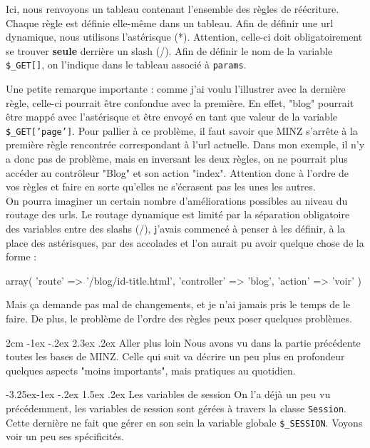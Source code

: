 \documentclass[a4paper,11pt]{article}
\makeatletter
\renewcommand\section{\@startsection{section}{1}{\z@}%
	{2cm \@plus -1ex \@minus -.2ex}%
	{2.3ex \@plus.2ex}%
	{\color{bleuClair}\reset@font\Large\bfseries}}
\renewcommand{\subsection}{\@startsection{subsection}{2}{\z@}%
             {-3.25ex\@plus -1ex \@minus -.2ex}%
             {1.5ex \@plus .2ex}%
             {\color{bleuFonce}\normalfont\large\bfseries}}
\makeatother
\begin{document}
Ici, nous renvoyons un tableau contenant l'ensemble des règles de réécriture. Chaque règle est définie elle-même dans un tableau. Afin de définir une url dynamique, nous utilisons l'astérisque (*). Attention, celle-ci doit obligatoirement se trouver \textbf{seule} derrière un slash (/). Afin de définir le nom de la variable \texttt{\$\_GET[]}, on l'indique dans le tableau associé à \texttt{params}.

Une petite remarque importante : comme j'ai voulu l'illustrer avec la dernière règle, celle-ci pourrait être confondue avec la première. En effet, "blog" pourrait être mappé avec l'astérisque et être envoyé en tant que valeur de la variable \texttt{\$\_GET['page']}. Pour pallier à ce problème, il faut savoir que MINZ s'arrête à la première règle rencontrée correspondant à l'url actuelle. Dans mon exemple, il n'y a donc pas de problème, mais en inversant les deux règles, on ne pourrait plus accéder au contrôleur "Blog" et son action "index". Attention donc à l'ordre de vos règles et faire en sorte qu'elles ne s'écrasent pas les unes les autres.\\

On pourra imaginer un certain nombre d'améliorations possibles au niveau du routage des urls. Le routage dynamique est limité par la séparation obligatoire des variables entre des slashs (/), j'avais commencé à penser à les définir, à la place des astérisques, par des accolades et l'on aurait pu avoir quelque chose de la forme :
\begin{PHP}
array(
  'route'       => '/blog/{id}-{title}.html',
  'controller'  => 'blog',
  'action'      => 'voir'
)
\end{PHP}
Mais ça demande pas mal de changements, et je n'ai jamais pris le temps de le faire. De plus, le problème de l'ordre des règles peux poser quelques problèmes.

\newpage

\section{Aller plus loin}
Nous avons vu dans la partie précédente toutes les bases de MINZ. Celle qui suit va décrire un peu plus en profondeur quelques aspects "moins importants", mais pratiques au quotidien.

\subsection{Les variables de session}
On l'a déjà un peu vu précédemment, les variables de session sont gérées à travers la classe \texttt{Session}. Cette dernière ne fait que gérer en son sein la variable globale \texttt{\$\_SESSION}. Voyons voir un peu ses spécificités.\\
\end{document}
